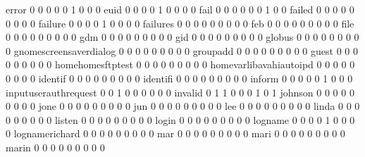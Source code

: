 \documentclass[compress,8pt]{beamer}
\begin{document}
\begin{frame}
\begin{Schunk}
  error                                      0   0   0   0   0   1   0   0   0
  euid                                       0   0   0   0   1   0   0   0   0
  fail                                       0   0   0   0   0   0   1   0   0
  failed                                     0   0   0   0   0   0   0   0   0
  failure                                    0   0   0   0   1   0   0   0   0
  failures                                   0   0   0   0   0   0   0   0   0
  feb                                        0   0   0   0   0   0   0   0   0
  file                                       0   0   0   0   0   0   0   0   0
  gdm                                        0   0   0   0   0   0   0   0   0
  gid                                        0   0   0   0   0   0   0   0   0
  globus                                     0   0   0   0   0   0   0   0   0
  gnomescreensaverdialog                     0   0   0   0   0   0   0   0   0
  groupadd                                   0   0   0   0   0   0   0   0   0
  guest                                      0   0   0   0   0   0   0   0   0
  homehomesftptest                           0   0   0   0   0   0   0   0   0
  homevarlibavahiautoipd                     0   0   0   0   0   0   0   0   0
  identif                                    0   0   0   0   0   0   0   0   0
  identifi                                   0   0   0   0   0   0   0   0   0
  inform                                     0   0   0   0   0   1   0   0   0
  inputuserauthrequest                       0   0   1   0   0   0   0   0   0
  invalid                                    0   1   1   0   0   0   1   0   1
  johnson                                    0   0   0   0   0   0   0   0   0
  jone                                       0   0   0   0   0   0   0   0   0
  jun                                        0   0   0   0   0   0   0   0   0
  lee                                        0   0   0   0   0   0   0   0   0
  linda                                      0   0   0   0   0   0   0   0   0
  listen                                     0   0   0   0   0   0   0   0   0
  login                                      0   0   0   0   0   0   0   0   0
  logname                                    0   0   0   0   1   0   0   0   0
  lognamerichard                             0   0   0   0   0   0   0   0   0
  mar                                        0   0   0   0   0   0   0   0   0
  mari                                       0   0   0   0   0   0   0   0   0
  marin                                      0   0   0   0   0   0   0   0   0

\end{Schunk}
\end{frame}
\end{document}
